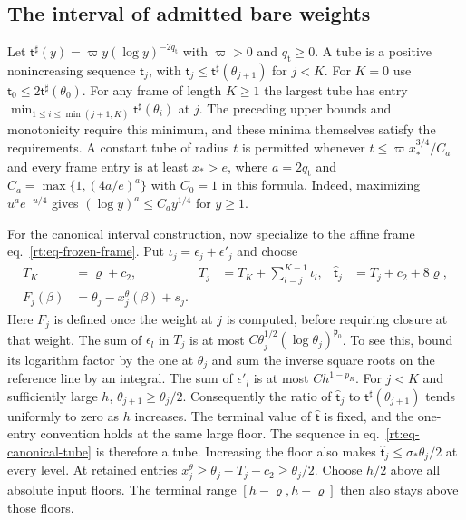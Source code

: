 \documentclass[11pt,letterpaper,reqno]{amsart}
\numberwithin{equation}{section}
\renewcommand{\eqref}[1]{\textup{eq.~\ref{#1}}}
\theoremstyle{definition}
\theoremstyle{remark}
\begin{document}
\subsection{The interval of admitted bare weights}

Let $\mathsf t^\sharp(y)=\varpi y(\log y)^{-2q_{\mathrm t}}$ with
$\varpi>0$ and $q_{\mathrm t}\ge0$. A tube is a positive
nonincreasing sequence $\mathsf t_j$, with
$\mathsf t_j\le\mathsf t^\sharp(\theta_{j+1})$ for $j<K$.
For $K=0$ use $\mathsf t_0\le2\mathsf t^\sharp(\theta_0)$.
For any frame of length $K\ge1$ the largest tube has entry
$\min_{1\le i\le\min(j+1,K)}\mathsf t^\sharp(\theta_i)$ at $j$.
The preceding upper bounds and monotonicity require this minimum,
and these minima themselves satisfy the requirements. A constant
tube of radius $t$ is permitted whenever
$t\le\varpi x_*^{3/4}/C_a$ and every frame entry is at least $x_*>e$,
where $a=2q_{\mathrm t}$ and $C_a=\max\{1,(4a/e)^a\}$ with
$C_0=1$ in this formula. Indeed, maximizing
$u^a e^{-u/4}$ gives $(\log y)^a\le C_a y^{1/4}$ for $y\ge1$.

For the canonical interval construction, now specialize to the
affine frame \eqref{rt:eq-frozen-frame}. Put $\iota_j=\epsilon_j+\epsilon'_j$ and choose
\begin{align}
 T_K&=\varrho+c_2,&
 T_j&=T_K+\sum_{l=j}^{K-1}\iota_l,&
 \widehat{\mathsf t}_j&=T_j+c_2+8\varrho,\label{rt:eq-canonical-tube}\\
 F_j(\beta)&=\theta_j-x_j^\theta(\beta)+s_j.\nonumber
\end{align}
Here $F_j$ is defined once the weight at $j$ is computed, before
requiring closure at that weight. The sum of $\epsilon_l$ in
$T_j$ is at most $C\theta_j^{1/2}(\log\theta_j)^{\mathfrak p_0}$.
To see this, bound its logarithm factor by the one at $\theta_j$
and sum the inverse square roots on the reference line by an
integral. The sum of $\epsilon'_l$ is at most $C h^{1-p_R}$.
For $j<K$ and sufficiently large $h$, $\theta_{j+1}\ge\theta_j/2$.
Consequently the ratio of $\widehat{\mathsf t}_j$ to
$\mathsf t^\sharp(\theta_{j+1})$ tends uniformly to zero as $h$
increases. The terminal value of $\widehat{\mathsf t}$ is fixed,
and the one-entry convention holds at the same large floor.
The sequence in \eqref{rt:eq-canonical-tube} is therefore a tube.
Increasing the floor also makes
$\widehat{\mathsf t}_j\le\sigma_*\theta_j/2$ at every level.
At retained entries $x_j^\theta\ge\theta_j-T_j-c_2\ge\theta_j/2$.
Choose $h/2$ above all absolute input floors. The terminal range
$[h-\varrho,h+\varrho]$ then also stays above those floors.
\end{document}
